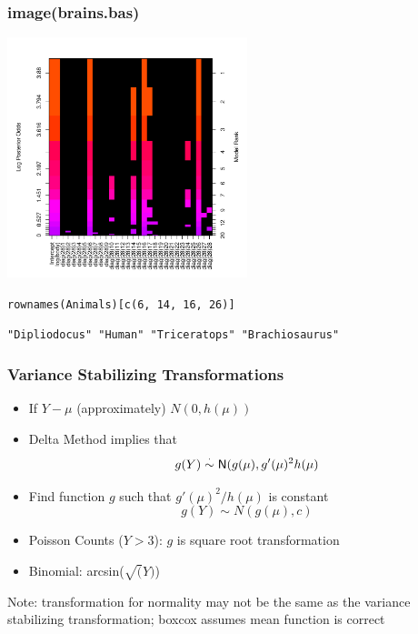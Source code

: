 \documentclass[handout]{beamer}
\begin{document}
\begin{frame}  \frametitle{image(brains.bas)}
\includegraphics[height=2.75in]{brains-image}

{\tt rownames(Animals)[c(6, 14, 16, 26)]  }

{\tt "Dipliodocus" "Human" "Triceratops" "Brachiosaurus"}
\end{frame}

  \begin{frame}\frametitle{Variance Stabilizing Transformations}
    \begin{itemize}
    \item If $Y - \mu$ (approximately) $N(0, h(\mu))$ \pause
    \item Delta Method implies that 
$$g(Y) \stackrel{\cdot}{\sim}\textsf{N}( g(\mu),  g'(\mu)^2 h(\mu)$$ 

\item Find function $g$ such that $g'(\mu)^2/h(\mu)$ is constant
$$g(Y) \sim N(g(\mu), c)$$
    \end{itemize}
  
\begin{itemize}
\item Poisson Counts ($Y > 3$): $g$ is square root transformation \pause
\item Binomial: arcsin($ \sqrt(Y)$)
\end{itemize}
Note: transformation for normality may not be the same as the variance
stabilizing transformation; boxcox assumes mean function is correct

\end{frame}
\end{document}
